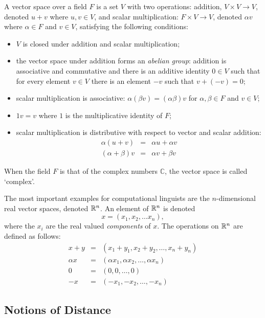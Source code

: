 \documentclass[12pt]{report}
\begin{document}
\begin{defn}
A vector space over a field $F$ is a set $V$ with two operations: addition, $V \times V \rightarrow V$, denoted $u + v$ where $u,v \in V$, and scalar multiplication: $F \times V \rightarrow V$, denoted $\alpha v$ where $\alpha \in F$ and $v \in V$,
satisfying the following conditions:
\begin{itemize}
\item $V$ is closed under addition and scalar multiplication;
\item the vector space under addition forms an \emph{abelian group}: addition is associative and commutative and there is an additive identity $0 \in V$ such that for every element $v \in V$ there is an element $-v$ such that $v + (-v) = 0$;
\item scalar multiplication is associative: $\alpha (\beta v) = (\alpha \beta) v$ for $\alpha, \beta \in F$ and $v \in V$;
\item $1v = v$ where $1$ is the multiplicative identity of $F$;
\item scalar multiplication is distributive with respect to vector and scalar addition:
\begin{eqnarray*}
\alpha(u + v) & = & \alpha u + \alpha v\\
(\alpha + \beta)v & = & \alpha v + \beta v
\end{eqnarray*}
\end{itemize}
When the field $F$ is that of the complex numbers $\mathbb{C}$, the vector space is called `complex'.
\end{defn}

\begin{example}
The most important examples for computational linguists are the $n$-dimensional real vector spaces, denoted $\mathbb{R}^n$. An element of $\mathbb{R}^n$ is denoted
$$x = (x_1,x_2,\ldots x_n),$$
where the $x_i$ are the real valued \emph{components} of $x$. The operations on $\mathbb{R}^n$ are defined as follows:
\begin{eqnarray*}
x + y & = & (x_1 + y_1, x_2 + y_2, \ldots, x_n + y_n)\\
\alpha x & = & (\alpha x_1, \alpha x_2, \ldots, \alpha x_n)\\
0 & = & (0,0,\ldots, 0)\\
-x & = & (-x_1, -x_2, \ldots, -x_n)
\end{eqnarray*}
\end{example}

\subsection{Notions of Distance}
\end{document}
